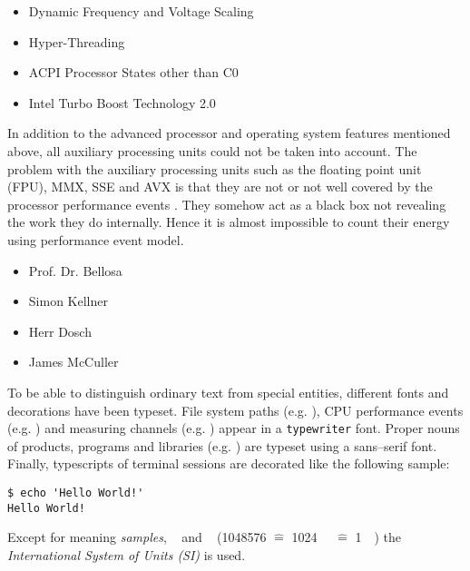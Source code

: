 \begin{itemize}

\item Dynamic Frequency and Voltage Scaling \cite{wiki:DVFS}

\item Hyper-Threading \cite{wiki:HT}

\item ACPI Processor States other than C0 \cite{wiki:ACPI}

\item Intel\TReg{} Turbo Boost Technology 2.0 \cite{wiki:IntelTurboBoost}

\end{itemize}

In addition to the advanced processor and operating system features mentioned
above, all auxiliary processing units could not be taken into account. The
problem with the auxiliary processing units such as the floating point unit
(FPU), MMX\cite{wiki:MMX}, SSE\cite{wiki:SSE} and AVX\cite{wiki:AVX} is that
they are not or not well covered by the processor performance events
\cite{intel2011events}. They somehow act as a black box not revealing the
work they do internally. Hence it is almost impossible to count their energy
using performance event model.


\begin{itemize}

\item Prof. Dr. Bellosa

\item Simon Kellner

\item Herr Dosch

\item James McCuller

\end{itemize}


\label{sec:preliminaries}

To be able to distinguish ordinary text from special entities, different fonts
and decorations have been typeset. File system paths (e.g. ),
CPU performance events (e.g. \JWctrCLK{}) and measuring channels (e.g.
) appear in a \texttt{typewriter} font. Proper nouns of
products, programs and libraries (e.g. \JWTnidaqmxbase{}) are typeset using a
\textsf{sans--serif} font. Finally, typescripts of terminal sessions are
decorated like the following sample:

\begin{lstlisting}[style=Shell]
$ echo 'Hello World!'
Hello World!
\end{lstlisting}


Except for \si{\samples} meaning \emph{samples}, \si{\mebi\byte} and
\si{\kibi\byte} (\SI{1048576}{\byte} $\hat{=}$ \SI{1024}{\kibi\byte} $\hat{=}$
\SI{1}{\mebi\byte}) the \emph{International System of Units (SI)} is used.


